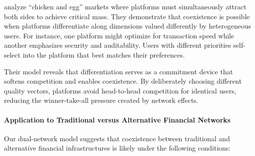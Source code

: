  analyze ``chicken and egg'' markets where platforms must simultaneously attract both sides to achieve critical mass. They demonstrate that coexistence is possible when platforms differentiate along dimensions valued differently by heterogeneous users. For instance, one platform might optimize for transaction speed while another emphasizes security and auditability. Users with different priorities self-select into the platform that best matches their preferences.

Their model reveals that differentiation serves as a commitment device that softens competition and enables coexistence. By deliberately choosing different quality vectors, platforms avoid head-to-head competition for identical users, reducing the winner-take-all pressure created by network effects.

\paragraph{Application to Traditional versus Alternative Financial Networks}

Our dual-network model suggests that coexistence between traditional and alternative financial infrastructures is likely under the following conditions:

